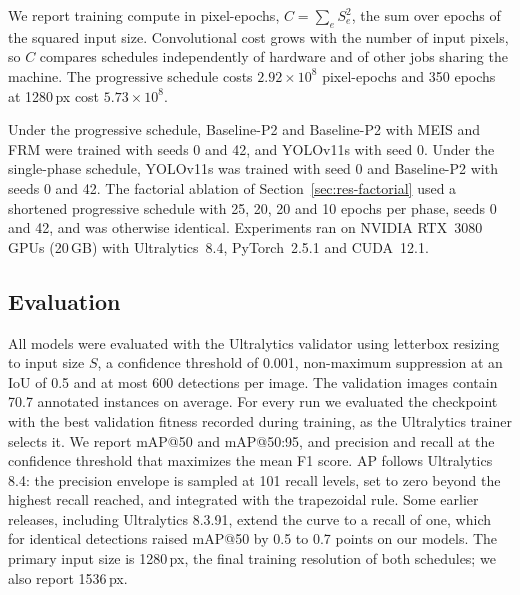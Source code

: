 \documentclass[preprint,12pt]{elsarticle}
\begin{document}
We report training compute in pixel-epochs, $C=\sum_{e} S_e^2$, the sum over
epochs of the squared input size. Convolutional cost grows with the number of
input pixels, so $C$ compares schedules independently of hardware and of other
jobs sharing the machine. The progressive schedule costs $2.92\times10^{8}$
pixel-epochs and 350 epochs at 1280\,px cost $5.73\times10^{8}$.

Under the progressive schedule, Baseline-P2 and Baseline-P2 with MEIS and FRM were
trained with seeds 0 and 42, and YOLOv11s with seed 0. Under the single-phase
schedule, YOLOv11s was trained with seed 0 and Baseline-P2 with seeds 0 and 42.
The factorial ablation of Section~\ref{sec:res-factorial} used a
shortened progressive schedule with 25, 20, 20 and 10 epochs per phase, seeds 0
and 42, and was otherwise identical. Experiments ran on NVIDIA RTX~3080 GPUs
(20\,GB) with Ultralytics~8.4, PyTorch~2.5.1 and CUDA~12.1.

\subsection{Evaluation}
\label{sec:eval}

All models were evaluated with the Ultralytics validator using letterbox resizing
to input size $S$, a confidence threshold of 0.001, non-maximum suppression at an
IoU of 0.5 and at most 600 detections per image. The validation images contain
70.7 annotated instances on average. For every run we evaluated the checkpoint
with the best validation fitness recorded during training, as the Ultralytics
trainer selects it. We report mAP@50 and mAP@50:95, and precision and recall at
the confidence threshold that maximizes the mean F1 score. AP follows Ultralytics
8.4: the precision envelope is sampled at 101 recall levels, set to zero beyond
the highest recall reached, and integrated with the trapezoidal rule. Some earlier
releases, including Ultralytics 8.3.91, extend the curve to a recall of one, which
for identical detections raised mAP@50 by 0.5 to 0.7 points on our models. The
primary input size is 1280\,px, the final training resolution of both schedules;
we also report 1536\,px.
\end{document}

